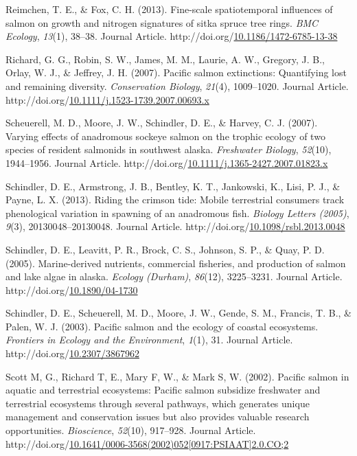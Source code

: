 \documentclass [11pt, proquest] {uwthesis}[2015/03/03]
\newlength{\cslhangindent}
\newenvironment{CSLReferences}%
{\setlength{\parindent}{0pt}%
\everypar{\setlength{\hangindent}{\cslhangindent}}\ignorespaces}%
{\par}
\begin{document}
\begin{CSLReferences}{1}{0}
\leavevmode\hypertarget{ref-Reimchen2013}{}%
Reimchen, T. E., \& Fox, C. H. (2013). Fine-scale spatiotemporal influences of salmon on growth and nitrogen signatures of sitka spruce tree rings. \emph{BMC Ecology}, \emph{13}(1), 38--38. Journal Article. http://doi.org/\href{https://doi.org/10.1186/1472-6785-13-38}{10.1186/1472-6785-13-38}

\leavevmode\hypertarget{ref-Gustafson2007}{}%
Richard, G. G., Robin, S. W., James, M. M., Laurie, A. W., Gregory, J. B., Orlay, W. J., \& Jeffrey, J. H. (2007). Pacific salmon extinctions: Quantifying lost and remaining diversity. \emph{Conservation Biology}, \emph{21}(4), 1009--1020. Journal Article. http://doi.org/\href{https://doi.org/10.1111/j.1523-1739.2007.00693.x}{10.1111/j.1523-1739.2007.00693.x}

\leavevmode\hypertarget{ref-Scheuerell2007}{}%
Scheuerell, M. D., Moore, J. W., Schindler, D. E., \& Harvey, C. J. (2007). Varying effects of anadromous sockeye salmon on the trophic ecology of two species of resident salmonids in southwest alaska. \emph{Freshwater Biology}, \emph{52}(10), 1944--1956. Journal Article. http://doi.org/\href{https://doi.org/10.1111/j.1365-2427.2007.01823.x}{10.1111/j.1365-2427.2007.01823.x}

\leavevmode\hypertarget{ref-Schindler2013}{}%
Schindler, D. E., Armstrong, J. B., Bentley, K. T., Jankowski, K., Lisi, P. J., \& Payne, L. X. (2013). Riding the crimson tide: Mobile terrestrial consumers track phenological variation in spawning of an anadromous fish. \emph{Biology Letters (2005)}, \emph{9}(3), 20130048--20130048. Journal Article. http://doi.org/\href{https://doi.org/10.1098/rsbl.2013.0048}{10.1098/rsbl.2013.0048}

\leavevmode\hypertarget{ref-Schindler2005}{}%
Schindler, D. E., Leavitt, P. R., Brock, C. S., Johnson, S. P., \& Quay, P. D. (2005). Marine-derived nutrients, commercial fisheries, and production of salmon and lake algae in alaska. \emph{Ecology (Durham)}, \emph{86}(12), 3225--3231. Journal Article. http://doi.org/\href{https://doi.org/10.1890/04-1730}{10.1890/04-1730}

\leavevmode\hypertarget{ref-Schindler2003}{}%
Schindler, D. E., Scheuerell, M. D., Moore, J. W., Gende, S. M., Francis, T. B., \& Palen, W. J. (2003). Pacific salmon and the ecology of coastal ecosystems. \emph{Frontiers in Ecology and the Environment}, \emph{1}(1), 31. Journal Article. http://doi.org/\href{https://doi.org/10.2307/3867962}{10.2307/3867962}

\leavevmode\hypertarget{ref-Gende2002}{}%
Scott M, G., Richard T, E., Mary F, W., \& Mark S, W. (2002). Pacific salmon in aquatic and terrestrial ecosystems: Pacific salmon subsidize freshwater and terrestrial ecosystems through several pathways, which generates unique management and conservation issues but also provides valuable research opportunities. \emph{Bioscience}, \emph{52}(10), 917--928. Journal Article. http://doi.org/\href{https://doi.org/10.1641/0006-3568(2002)052\%5B0917:PSIAAT\%5D2.0.CO;2}{10.1641/0006-3568(2002)052{[}0917:PSIAAT{]}2.0.CO;2}


\end{CSLReferences}
\end{document}
